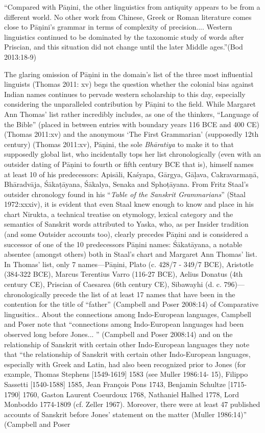 \begin{myquote}
“Compared with Pāṇini, the other linguistics from antiquity appears to be from a different world. No other work from Chinese, Greek or Roman literature comes close to Pāṇini’s grammar in terms of complexity of precision.... Western linguistics continued to be dominated by the taxonomic study of words after Priscian, and this situation did not change until the later Middle ages.”\hfill (Bod 2013:18-9)
\end{myquote}

The glaring omission of Pāṇini in the domain’s list of the three most influential linguists (Thomas 2011: xv) begs the question whether the colonial bias against Indian names continues to pervade western scholarship to this day, especially considering the unparalleled contribution by Pāṇini to the field. While Margaret Ann Thomas’ list rather incredibly includes, as one of the thinkers, “Language of the Bible” (placed in between entries with boundary years 116 BCE and 400 CE) (Thomas 2011:xv) and the anonymous ‘The First Grammarian’ (supposedly 12th century) (Thomas 2011:xv), Pāṇini, the sole \textit{Bhāratiya} to make it to that supposedly global list, who incidentally tops her list chronologically (even with an outsider dating of Pāṇini to fourth or fifth century BCE that is), himself names at least 10 of his predecessors: Apisāli, Kaśyapa, Gārgya, Gāḷava, Cakravarmaṇā, Bhāradvāja, Śākaṭāyana, Śākalya, Senaka and Sphoṭāyana. From Fritz Staal’s outsider chronology found in his “\textit{Table of the Sanskrit Grammarians}” (Staal 1972:xxxiv), it is evident that even Staal knew enough to know and place in his chart Nirukta, a technical treatise on etymology, lexical category and the semantics of Sanskrit words attributed to Yaska, who, as per Insider tradition (and some Outsider accounts too), clearly precedes Pāṇini and is considered a successor of one of the 10 predecessors Pāṇini names: Śākatāyana, a notable absentee (amongst others) both in Staal’s chart and Margaret Ann Thomas’ list. In Thomas’ list, only 7 names—Pāṇini, Plato (c. 428/7 - 349/7 BCE), Aristotle (384-322 BCE), Marcus Terentius Varro (116-27 BCE), Aelius Donatus (4th century CE), Priscian of Caesarea (6th century CE), Sibawayhi (d. c. 796)—chronologically precede the list of at least 17 names that have been in the contention for the title of “father” (Campbell and Poser 2008:14) of Comparative lingusitics.. About the connections among Indo-European languages, Campbell and Poser note that “connections among Indo-European languages had been observed long before Jones... ” (Campbell and Poser 2008:14) and on the relationship of Sanskrit with certain other Indo-European languages they note that “the relationship of Sanskrit with certain other Indo-European languages, especially with Greek and Latin, had also been recognized prior to Jones (for example, Thomas Stephens [1549-1619] 1583 (see Muller 1986:14- 15), Filippo Sassetti [1540-1588] 1585, Jean François Pons 1743, Benjamin Schultze [1715-1790] 1760, Gaston Laurent Coeurdoux 1768, Nathaniel Halhed 1778, Lord Monboddo 1774-1809 (cf. Zeller 1967). Moreover, there were at least 47 published accounts of Sanskrit before Jones’ statement on the matter (Muller 1986:14)” (Campbell and Poser 